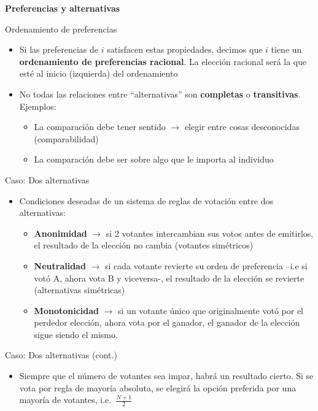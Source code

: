 \documentclass[
  ignorenonframetext,
]{beamer}
\providecommand{\tightlist}{%
  \setlength{\itemsep}{0pt}\setlength{\parskip}{0pt}}\usepackage{longtable,booktabs,array}
\begin{document}
\begin{frame}{\textbf{Preferencias y alternativas}}
\begin{block}{Ordenamiento de preferencias}
\protect\hypertarget{ordenamiento-de-preferencias}{}
\begin{itemize}
\tightlist
\item
  Si las preferencias de \(i\) satisfacen estas propiedades, decimos que
  \(i\) tiene un \textbf{ordenamiento de preferencias racional}. La
  elección racional será la que esté al inicio (izquierda) del
  ordenamiento
\item
  No todas las relaciones entre ``alternativas'' son \textbf{completas}
  o \textbf{transitivas}. Ejemplos:

  \begin{itemize}
  \tightlist
  \item
    La comparación debe tener sentido \(\longrightarrow\) elegir entre
    cosas desconocidas (comparabilidad)
  \item
    La comparación debe ser sobre algo que le importa al individuo
  \end{itemize}
\end{itemize}
\end{block}

\begin{block}{Caso: Dos alternativas}
\protect\hypertarget{caso-dos-alternativas}{}
\begin{itemize}
\tightlist
\item
  Condiciones deseadas de un sistema de reglas de votación entre dos
  alternativas:

  \begin{itemize}
  \tightlist
  \item
    \textbf{Anonimidad} \(\longrightarrow\) si 2 votantes intercambian
    sus votos antes de emitirlos, el resultado de la elección no cambia
    (votantes simétricos)
  \item
    \textbf{Neutralidad} \(\longrightarrow\) si cada votante revierte su
    orden de preferencia --i.e si votó A, ahora vota B y viceversa-, el
    resultado de la elección se revierte (alternativas simétricas)
  \item
    \textbf{Monotonicidad} \(\longrightarrow\) si un votante único que
    originalmente votó por el perdedor elección, ahora vota por el
    ganador, el ganador de la elección sigue siendo el mismo.
  \end{itemize}
\end{itemize}
\end{block}

\begin{block}{Caso: Dos alternativas (cont.)}
\protect\hypertarget{caso-dos-alternativas-cont.}{}
\begin{itemize}
\tightlist
\item
  Siempre que el número de votantes sea impar, habrá un resultado
  cierto. Si se vota por regla de mayoría absoluta, se elegirá la opción
  preferida por una mayoría de votantes, i.e.~\(\frac{N+1}{2}\)
\end{itemize}


\end{block}
\end{frame}
\end{document}
